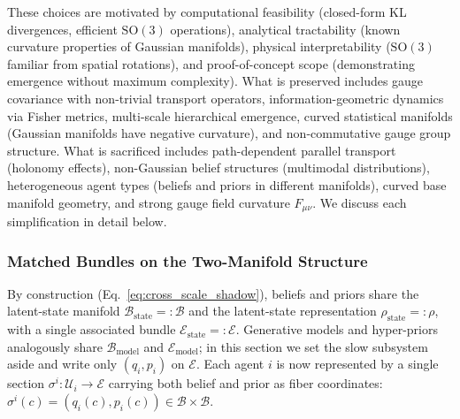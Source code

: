 \documentclass[11pt]{article}
\begin{document}
These choices are motivated by computational feasibility (closed-form KL divergences, efficient $\mathrm{SO}(3)$ operations), analytical tractability (known curvature properties of Gaussian manifolds), physical interpretability ($\mathrm{SO}(3)$ familiar from spatial rotations), and proof-of-concept scope (demonstrating emergence without maximum complexity). What is preserved includes gauge covariance with non-trivial transport operators, information-geometric dynamics via Fisher metrics, multi-scale hierarchical emergence, curved statistical manifolds (Gaussian manifolds have negative curvature), and non-commutative gauge group structure. What is sacrificed includes path-dependent parallel transport (holonomy effects), non-Gaussian belief structures (multimodal distributions), heterogeneous agent types (beliefs and priors in different manifolds), curved base manifold geometry, and strong gauge field curvature $F_{\mu\nu}$. We discuss each simplification in detail below.

\subsubsection{Matched Bundles on the Two-Manifold Structure}

By construction (Eq.~\eqref{eq:cross_scale_shadow}), beliefs and priors share the latent-state manifold $\mathcal{B}_{\mathrm{state}} =: \mathcal{B}$ and the latent-state representation $\rho_{\mathrm{state}} =: \rho$, with a single associated bundle $\mathcal{E}_{\mathrm{state}} =: \mathcal{E}$. Generative models and hyper-priors analogously share $\mathcal{B}_{\mathrm{model}}$ and $\mathcal{E}_{\mathrm{model}}$; in this section we set the slow subsystem aside and write only $(q_i, p_i)$ on $\mathcal{E}$. Each agent $i$ is now represented by a single section $\sigma^i: \mathcal{U}_i \to \mathcal{E}$ carrying both belief and prior as fiber coordinates: $\sigma^i(c) = (q_i(c), p_i(c)) \in \mathcal{B} \times \mathcal{B}$.
\end{document}
